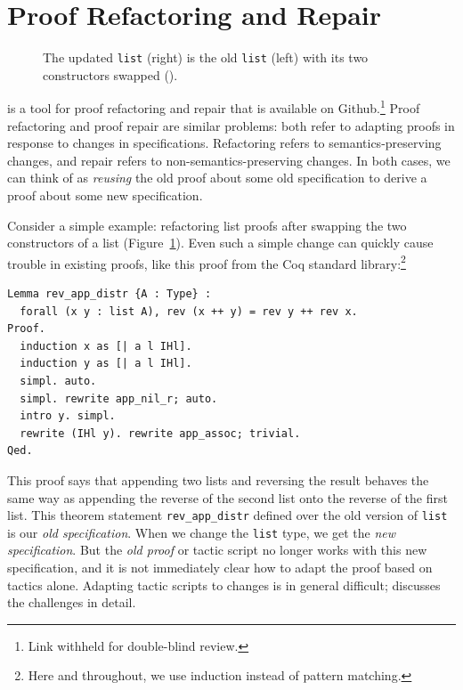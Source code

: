 \section{Proof Refactoring and Repair}
\label{sec:overview}

\begin{figure}
\begin{minipage}{0.46\textwidth}
   
\end{minipage}
\hfill
\begin{minipage}{0.46\textwidth}
   
\end{minipage}
\caption{The updated \lstinline{list} (right) is the old \lstinline{list} (left) with its two constructors swapped ().}
\label{fig:listswap}
\end{figure}

\toolname is a tool for proof refactoring and repair that is available on Github.\footnote{Link withheld for double-blind review.}
Proof refactoring and proof repair are similar problems: both refer to adapting proofs in response to changes
in specifications. Refactoring refers to semantics-preserving changes, and repair refers to non-semantics-preserving
changes. In both cases, we can think of \toolname as \textit{reusing} the old proof about some old specification
to derive a proof about some new specification.

Consider a simple example: refactoring list proofs after swapping the two constructors of a list (Figure~\ref{fig:listswap}).
Even such a simple change can quickly cause trouble in existing proofs, like this proof from the Coq standard library:\footnote{Here and throughout, we use induction instead of pattern matching.}

\begin{lstlisting}
Lemma rev_app_distr {A : Type} :
  forall (x y : list A), rev (x ++ y) = rev y ++ rev x.
Proof.
  induction x as [| a l IHl].
  induction y as [| a l IHl].
  simpl. auto.
  simpl. rewrite app_nil_r; auto.
  intro y. simpl.
  rewrite (IHl y). rewrite app_assoc; trivial.
Qed.
\end{lstlisting}
This proof says that appending two lists and reversing the result behaves the same way as appending
the reverse of the second list onto the reverse of the first list.
This theorem statement \lstinline{rev_app_distr} defined over the old version of \lstinline{list} is our \textit{old specification}.
When we change the \lstinline{list} type, we get the \textit{new specification}.
But the \textit{old proof} or tactic script no longer works with this new specification, and it is not
immediately clear how to adapt the proof based on tactics alone.
Adapting tactic scripts to changes is in general difficult; \citep{robert2018} 
discusses the challenges in detail.

